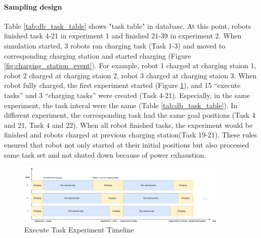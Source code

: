 \paragraph{Sampling design}
Table \ref{tab:db_task_table} shows "task table" in database. At this point, robots finished task 4-21 in experiment 1 and finished 21-39 in experiment 2. When simulation started, 3 robots ran charging task (Task 1-3) and moved to corresponding charging station and started charging (Figure \ref{fig:charging_station_event}). For example, robot 1 charged at charging staion 1, robot 2 charged at charging staion 2, robot 3 charged at charging staion 3. 
When robot fully charged, the first experiment started (Figure \ref{fig:execute_task_experiment_timeline}), and 15 ``execute tasks'' and 3 ``charging tasks'' were created (Task 4-21). Especially, in the same experiment, the task interal were the same (Table \ref{tab:db_task_table}). In different experiment, the corresponding task had the same goal positions (Task 4 and 21, Task 4 and 22). 
When all robot finished tasks, the experiment would be finished and robots charged at previous charging station(Task 19-21).
These rules ensured that robot not only started at their initial positions but also processed same task set and not shuted down because of power exhaustion.


\begin{figure}[htbp]
    \centering
    \includegraphics[width = 0.9\textwidth]{content/images/ch5/exe_exp_timeline.drawio.png}
    \caption{Execute Task Experiment Timeline}
    \label{fig:execute_task_experiment_timeline}
\end{figure}


